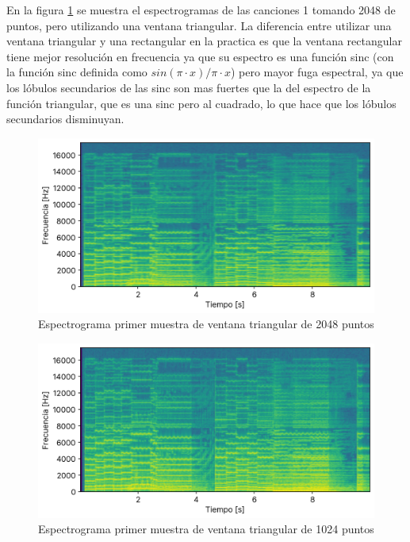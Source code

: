 \documentclass[12pt]{article}
\begin{document}
En la figura \ref{cancion1_espectograma_bartlett_2048} se muestra el espectrogramas de las canciones 1 tomando 2048 de puntos, pero utilizando una ventana triangular. La diferencia entre utilizar una ventana triangular y una rectangular en la practica es que la ventana rectangular tiene mejor resolución en frecuencia ya que su espectro es una función sinc (con la función sinc definida como $sin(\pi\cdot x)/\pi\cdot x$) pero mayor fuga espectral, ya que los lóbulos secundarios de las sinc son mas fuertes que la del espectro de la función triangular, que es una sinc pero al cuadrado, lo que hace que los lóbulos secundarios disminuyan.

\begin{figure}[H]
\centering
\includegraphics{plot/cancion1_espectograma_bartlett_2048.png}
\caption{Espectrograma primer muestra de ventana triangular de 2048 puntos}
\label{cancion1_espectograma_bartlett_2048}
\end{figure}

\iffalse
\begin{figure}[H]
\centering
\includegraphics{plot/cancion1_espectograma_bartlett_1024.png}
\caption{Espectrograma primer muestra de ventana triangular de 1024 puntos}
\label{cancion1_espectograma_bartlett_1024}
\end{figure}
\end{document}
